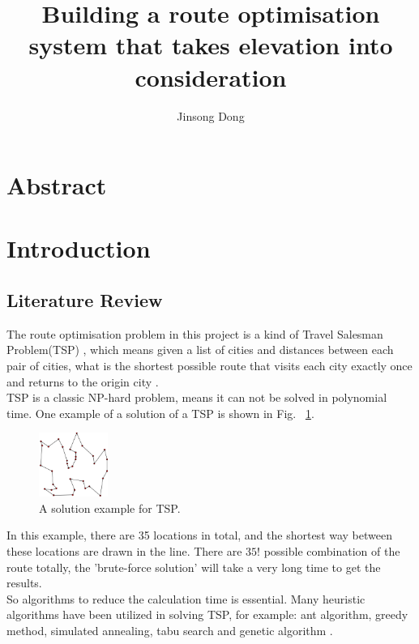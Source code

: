 \documentclass[project-plan]{report-template}
\title{Building a route optimisation system that takes elevation into consideration}
\author{Jinsong Dong}
\begin{document}
\maketitlepage  %

\section* {Abstract}

\section {Introduction}
\subsection {Literature Review}
The route optimisation problem in this project is a kind of Travel Salesman Problem(TSP) \cite{lawler1985travelling}, 
which means given a list of cities and distances between each pair of cities, what is the shortest possible
route that visits each city exactly once and returns to the origin city \cite{TSP_wiki}.\\

TSP is a classic NP-hard problem, means it can not be solved in polynomial time.
One example of a solution of a TSP is shown in Fig.~ \ref{fig:solution_of_TSP}.

\begin{figure}
    \begin{center}
        \includegraphics[width=0.2\textwidth]{solution_of_a_TSP.png}
    \end{center}
    \caption{\label{fig:solution_of_TSP} A solution example for TSP.}
\end{figure}

In this example, there are 35 locations in total, and the shortest way between these locations are drawn in the line.
There are $35!$ possible combination of the route totally, the 'brute-force solution' will take a very long time to get the results.\\

So algorithms to reduce the calculation time is essential. Many heuristic algorithms have been utilized in solving TSP\cite{TSP_review},
for example: ant algorithm, greedy method, simulated annealing, tabu search and genetic algorithm \cite{genetic_on_TSP}. \\
\end{document}
